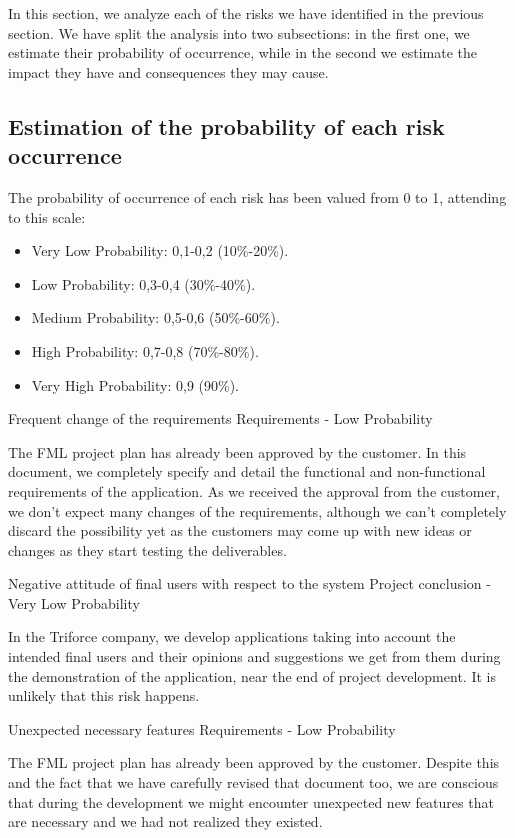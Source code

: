 
In this section, we analyze each of the risks we have identified in the previous section. We have split the analysis into two subsections: in the first one, we estimate their probability of occurrence, while in the second we estimate the impact they have and consequences they may cause.

\subsection{Estimation of the probability of each risk occurrence}
The probability of occurrence of each risk has been valued from 0 to 1, attending to this scale:
\begin{itemize}
\item Very Low Probability: 0,1-0,2 (10\%-20\%).
\item Low Probability: 0,3-0,4 (30\%-40\%).
\item Medium Probability: 0,5-0,6 (50\%-60\%).
\item High Probability: 0,7-0,8 (70\%-80\%).
\item Very High Probability: 0,9 (90\%).
\end{itemize}


\begin{risk}{Frequent change of the requirements}
\riskcat Requirements
 - Low Probability 

The FML project plan has already been approved by the customer. In this document, we completely specify and detail the functional and non-functional requirements of the application. As we received the approval from the customer, we don't expect many changes of the requirements, although we can't completely discard the possibility yet as the customers may come up with new ideas or changes as they start testing the deliverables.
\end{risk}

\begin{risk}{Negative attitude of final users with respect to the system}
\riskcat Project conclusion
 - Very Low Probability 

In the Triforce company, we develop applications taking into account the intended final users and their opinions and suggestions we get from them during the demonstration of the application, near the end of project development. It is unlikely that this risk happens. 
\end{risk}

\begin{risk}{Unexpected necessary features}
\riskcat Requirements
 - Low Probability 

The FML project plan has already been approved by the customer. Despite this and the fact that we have carefully revised that document too, we are conscious that during the development we might encounter unexpected new features that are necessary and we had not realized they existed.
\end{risk}

